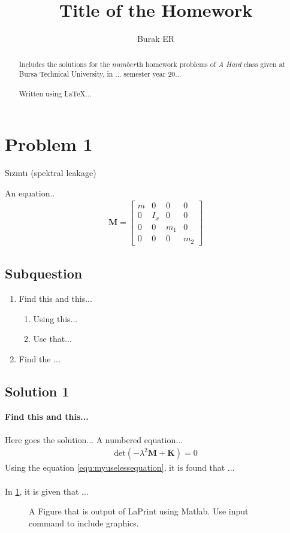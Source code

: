\documentclass[]{report}
\title{Title of the Homework}
\author{Burak ER}
\begin{document}
\maketitle
\begin{abstract}
Includes the solutions for the $number$th homework problems of \emph{A Hard} class given at Bursa Technical University, in $...$ semester year $20..$.
\\
\\
Written using \LaTeX ...
\end{abstract}
\section*{Problem 1}
Sızıntı (spektral leakage)

An equation..
\begin{align*}
\mathbf{M}=\left[\begin{array}{cccc}
m&0&0&0\\
0&I_x&0&0 \\
0&0&m_1&0 \\
0&0&0&m_2
\end{array}\right]
\end{align*}

\subsection*{Subquestion}

\begin{enumerate}
\item Find this and this...
\begin{enumerate}
\item Using this...
\item Use that... 
\end{enumerate}
\item Find the ...
\end{enumerate}

\begin{center}
\subsection*{Solution 1}
\end{center}
\textbf{Find this and this...}\\~\\
Here goes the solution...
A numbered equation...
\begin{align}
\mathrm{det}\left(-\lambda^2\mathbf{M}+ \mathbf{K}\right)=0
\label{equ:myuselessequation}
\end{align}
Using the equation \cref{equ:myuselessequation}, it is found that ...\\~\\
In \cref{fig:timedependenttires}, it is given that ...
\begin{figure}[ht!]
\centering

\caption{A Figure that is output of LaPrint using Matlab. Use input command to include graphics.}
\label{fig:timedependenttires}
\end{figure}
\\~\\
\end{document}
